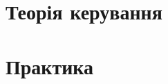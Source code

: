 \documentclass[a4paper,12pt,oneside,ukrainian]{book}
\begin{document}
\tableofcontents
\chapter{Теорія керування}

\chapter{Практика}

\end{document}

